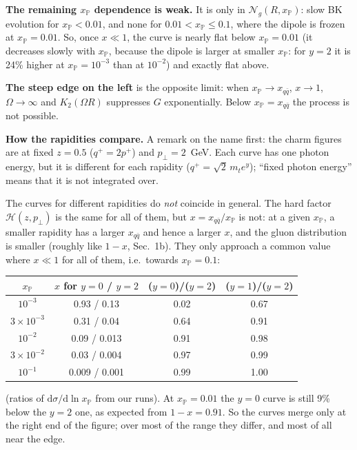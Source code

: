 \documentclass[12pt]{article}
\newcommand{\xpo}{x_{\mathbb{P}}}
\begin{document}
\textbf{The remaining $\xpo$ dependence is weak.} It is only in $\mathcal{N}_g(R,\xpo)$: slow BK
evolution for $\xpo<0.01$, and none for $0.01<\xpo\leq0.1$, where the dipole is frozen at
$\xpo=0.01$. So, once $x\ll1$, the curve is nearly flat below $\xpo=0.01$ (it decreases slowly with
$\xpo$, because the dipole is larger at smaller $\xpo$: for $y=2$ it is 24\% higher at $\xpo=10^{-3}$
than at $10^{-2}$) and exactly flat above.

\textbf{The steep edge on the left} is the opposite limit: when $\xpo\to x_{q\bar q}$, $x\to1$,
$\Omega\to\infty$ and $K_2(\Omega R)$ suppresses $G$ exponentially. Below
$\xpo=x_{q\bar q}$ the process is not possible.

\textbf{How the rapidities compare.} A remark on the name first: the charm figures are at fixed
$z=0.5$ ($q^+=2p^+$) and $p_\perp=2$~GeV. Each curve has one photon energy, but it is different for
each rapidity ($q^+=\sqrt2\,m_te^y$); ``fixed photon energy'' means that it is not integrated over.

The curves for different rapidities do \emph{not} coincide in general. The hard factor
$\mathcal{H}(z,p_\perp)$ is the same for all of them, but $x=x_{q\bar q}/\xpo$ is not: at a given
$\xpo$, a smaller rapidity has a larger $x_{q\bar q}$ and hence a larger $x$, and the gluon
distribution is smaller (roughly like $1-x$, Sec.~1b). They only approach a common value where
$x\ll1$ for all of them, i.e.\ towards $\xpo=0.1$:
\begin{center}
\begin{tabular}{cccc}
\toprule
$\xpo$ & $x$ for $y=0$ / $y=2$ & ($y=0$)/($y=2$) & ($y=1$)/($y=2$) \\
\midrule
$10^{-3}$ & 0.93 / 0.13 & 0.02 & 0.67 \\
$3\times10^{-3}$ & 0.31 / 0.04 & 0.64 & 0.91 \\
$10^{-2}$ & 0.09 / 0.013 & 0.91 & 0.98 \\
$3\times10^{-2}$ & 0.03 / 0.004 & 0.97 & 0.99 \\
$10^{-1}$ & 0.009 / 0.001 & 0.99 & 1.00 \\
\bottomrule
\end{tabular}
\end{center}
(ratios of $\mathrm{d}\sigma/\mathrm{d}\ln\xpo$ from our runs). At $\xpo=0.01$ the $y=0$ curve is still
9\% below the $y=2$ one, as expected from $1-x=0.91$. So the curves merge only at the right end of
the figure; over most of the range they differ, and most of all near the edge.
\end{document}
